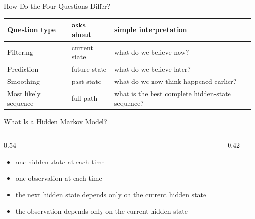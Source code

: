 \documentclass[aspectratio=169]{beamer}
\begin{document}
\begin{frame}{How Do the Four Questions Differ?}
\small
\begin{center}
\begin{tabular}{>{\raggedright\arraybackslash}p{} >{\raggedright\arraybackslash}p{} >{\raggedright\arraybackslash}p{}}
\toprule
Question type & asks about & simple interpretation \\
\midrule
Filtering & current state & what do we believe now? \\
Prediction & future state & what do we believe later? \\
Smoothing & past state & what do we now think happened earlier? \\
Most likely sequence & full path & what is the best complete hidden-state sequence? \\
\bottomrule
\end{tabular}
\end{center}
\end{frame}

\begin{frame}{What Is a Hidden Markov Model?}
\begin{columns}[T,onlytextwidth]
  \begin{column}{0.54\textwidth}
    \begin{itemize}
      \item one hidden state at each time
      \item one observation at each time
      \item the next hidden state depends only on the current hidden state
      \item the observation depends only on the current hidden state
    \end{itemize}
  \end{column}
  \begin{column}{0.42\textwidth}
    \begin{center}
    \end{center}
  \end{column}
\end{columns}
\end{frame}
\end{document}
